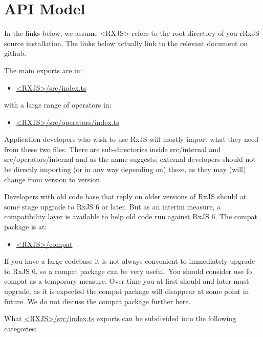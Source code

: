 \section{API Model}

In the links below, we assume <RXJS> refers to the root directory of you rRxJS
source installation. The links below actually link to the relevant document on github.

The main exports are in:

\begin{itemize}
  \item \href{https://github.com/ReactiveX/rxjs/blob/master/src/index.ts}
        {<RXJS>/src/index.ts}
\end{itemize}

with a large range of operators in:

\begin{itemize}
  \item \href{https://github.com/ReactiveX/rxjs/blob/master/src/operators/index.ts}
        {<RXJS>/src/operators/index.ts}
\end{itemize}

Application developers who wish to use RxJS will mostly import what they need from
these two files. There are sub-directories inside src/internal and src/operators/internal
and as the name suggests, external developers should not be directly importing (or in
any way depending on) these, as they may (will) change from version to version.

Developers with old code base that reply on older versions of RxJS should at some
stage upgrade to RxJS 6 or later. But as an interim measure, a compatibility layer is
available to help old code run against RxJS 6. The compat package is at:

\begin{itemize}
  \item \href{https://github.com/ReactiveX/rxjs/tree/master/compat}
        {<RXJS>/compat}
\end{itemize}

If you have a large codebase it is not always convenient to immediately upgrade to
RxJS 6, so a compat package can be very useful. You should consider use fo compat
as a temporary measure. Over time you at first should and later must upgrade, as it is
expected the compat package will disappear at some point in future. We do not
discuss the compat package further here.

What
\href{https://github.com/ReactiveX/rxjs/blob/master/src/index.ts}
{<RXJS>/src/index.ts}
exports can be subdivided into the following categories:

